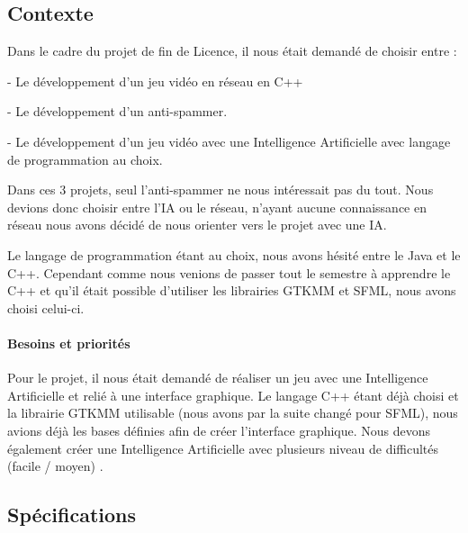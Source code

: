 \documentclass[a4paper,oneside]{article}
\begin{document}
\subsection{Contexte}

Dans le cadre du projet de fin de Licence, il nous était demandé de choisir entre :

  - Le développement d'un jeu vidéo en réseau en C++

  - Le développement d'un anti-spammer.

  - Le développement d'un jeu vidéo avec une Intelligence Artificielle avec langage de programmation au choix.

Dans ces 3 projets, seul l'anti-spammer ne nous intéressait pas du tout.
Nous devions donc choisir entre l'IA ou le réseau, n'ayant aucune connaissance en réseau nous avons décidé de nous orienter vers le projet avec une IA.

Le langage de programmation étant au choix, nous avons hésité entre le Java et le C++.
Cependant comme nous venions de passer tout le semestre à apprendre le C++ et qu'il était possible d'utiliser les librairies GTKMM et SFML, nous avons choisi celui-ci.


\paragraph{Besoins et priorités\\}

Pour le projet, il nous était demandé de réaliser un jeu avec une Intelligence Artificielle et relié à une interface graphique. Le langage C++ étant  déjà choisi et la librairie GTKMM utilisable (nous avons par la suite changé pour SFML), nous avions déjà les bases définies afin de créer l'interface graphique.
Nous devons également créer une Intelligence Artificielle avec plusieurs niveau de difficultés (facile / moyen) .




\subsection{Spécifications}
\end{document}
